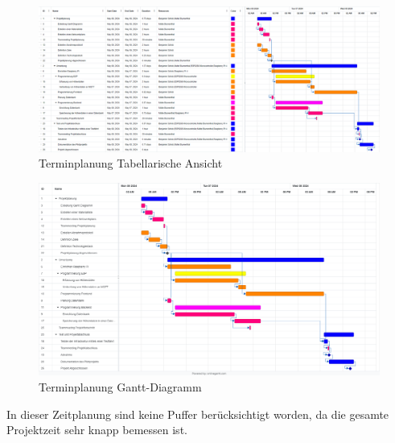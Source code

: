 \begin{figure} [h]
	\centering
	\includegraphics[width=15cm]{images/Zeitplanung.png}
	\caption[Terminplanung Tabellarisch]{Terminplanung Tabellarische Ansicht}
	\label{fig:terminplanung_tabellarisch}
\end{figure}

\begin{figure} [h]
	\centering
	\includegraphics[width=15cm]{images/Gantt.png}
	\caption[Terminplanung Gantt]{Terminplanung Gantt-Diagramm}
	\label{fig:terminplanung_gantt}
\end{figure}

In dieser Zeitplanung sind keine Puffer berücksichtigt worden, da die gesamte Projektzeit sehr knapp bemessen ist.